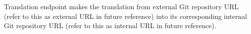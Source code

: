 \documentclass[../main.tex]{subfiles}
\begin{document}
Translation endpoint makes the translation from external Git repository URL (refer to this as external URL in future reference) into its corresponding internal Git repository URL (refer to this as internal URL in future reference).
\end{document}
